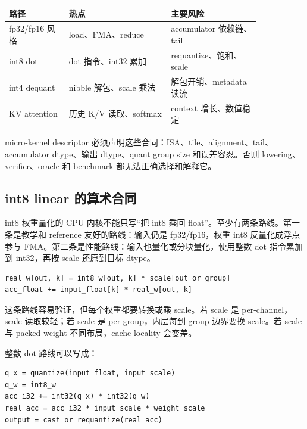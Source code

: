 \begin{center}
\begin{tabular}{p{0.20\linewidth}p{0.34\linewidth}p{0.30\linewidth}}
\toprule
路径 & 热点 & 主要风险 \\
\midrule
fp32/fp16 风格 & load、FMA、reduce & accumulator 依赖链、tail \\
int8 dot & dot 指令、int32 累加 & requantize、饱和、scale \\
int4 dequant & nibble 解包、scale 乘法 & 解包开销、metadata 读流 \\
KV attention & 历史 K/V 读取、softmax & context 增长、数值稳定 \\
\bottomrule
\end{tabular}
\end{center}

micro-kernel descriptor 必须声明这些合同：ISA、tile、alignment、tail、accumulator dtype、输出 dtype、quant group size 和误差容忍。否则 lowering、verifier、oracle 和 benchmark 都无法正确选择和解释它。

\subsection{int8 linear 的算术合同}

int8 权重量化的 CPU 内核不能只写“把 int8 乘回 float”。至少有两条路线。第一条是教学和 reference 友好的路线：输入仍是 fp32/fp16，权重 int8 反量化成浮点参与 FMA。第二条是性能路线：输入也量化或分块量化，使用整数 dot 指令累加到 int32，再按 scale 还原到目标 dtype。

\begin{lstlisting}[numbers=none,caption={float input + int8 weight 的合同}]
real_w[out, k] = int8_w[out, k] * scale[out or group]
acc_float += input_float[k] * real_w[out, k]
\end{lstlisting}

这条路线容易验证，但每个权重都要转换或乘 scale。若 scale 是 per-channel，scale 读取较轻；若 scale 是 per-group，内层每到 group 边界要换 scale。若 scale 与 packed weight 不同布局，cache locality 会变差。

整数 dot 路线可以写成：

\begin{lstlisting}[numbers=none,caption={int8 dot + int32 accumulator 的合同}]
q_x = quantize(input_float, input_scale)
q_w = int8_w
acc_i32 += int32(q_x) * int32(q_w)
real_acc = acc_i32 * input_scale * weight_scale
output = cast_or_requantize(real_acc)
\end{lstlisting}

